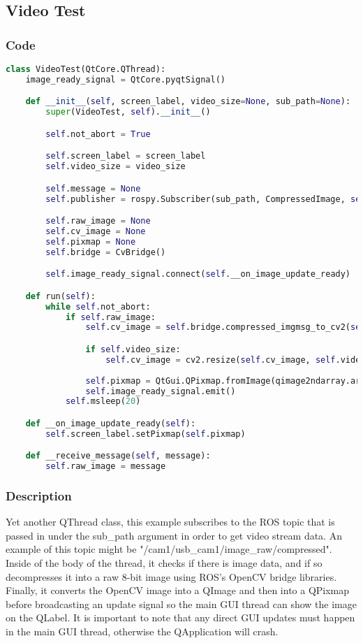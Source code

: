 \subsection{Video Test}
\subsubsection{Code}
\begin{lstlisting}[language=python]
class VideoTest(QtCore.QThread):
    image_ready_signal = QtCore.pyqtSignal()

    def __init__(self, screen_label, video_size=None, sub_path=None):
        super(VideoTest, self).__init__()

        self.not_abort = True

        self.screen_label = screen_label
        self.video_size = video_size

        self.message = None
        self.publisher = rospy.Subscriber(sub_path, CompressedImage, self.__receive_message)

        self.raw_image = None
        self.cv_image = None
        self.pixmap = None
        self.bridge = CvBridge()

        self.image_ready_signal.connect(self.__on_image_update_ready)

    def run(self):
        while self.not_abort:
            if self.raw_image:
                self.cv_image = self.bridge.compressed_imgmsg_to_cv2(self.raw_image, "rgb8")

                if self.video_size:
                    self.cv_image = cv2.resize(self.cv_image, self.video_size)
                    
                self.pixmap = QtGui.QPixmap.fromImage(qimage2ndarray.array2qimage(self.cv_image))
                self.image_ready_signal.emit()
            self.msleep(20)

    def __on_image_update_ready(self):
        self.screen_label.setPixmap(self.pixmap)

    def __receive_message(self, message):
        self.raw_image = message
\end{lstlisting}
\subsubsection{Description}
Yet another QThread class, this example subscribes to the ROS topic that is passed in under the sub\_path argument in order to get video stream data.
An example of this topic might be "/cam1/usb\_cam1/image\_raw/compressed".
Inside of the body of the thread, it checks if there is image data, and if so decompresses it into a raw 8-bit image using ROS's OpenCV bridge libraries.
Finally, it converts the OpenCV image into a QImage and then into a QPixmap before broadcasting an update signal so the main GUI thread can show the image on the QLabel.
It is important to note that any direct GUI updates must happen in the main GUI thread, otherwise the QApplication will crash.